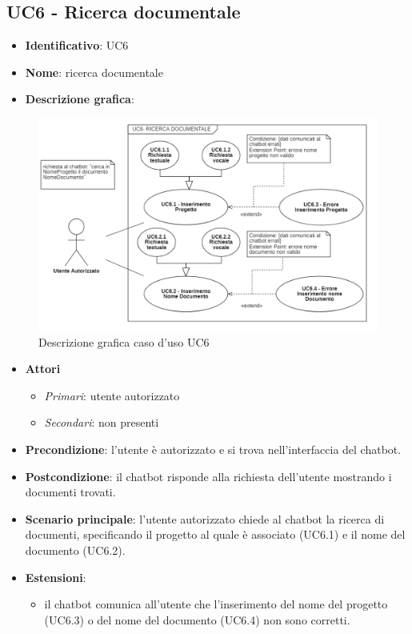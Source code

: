 \subsection{UC6 - Ricerca documentale}
\begin{itemize}
    \item \textbf{Identificativo}: UC6
    \item \textbf{Nome}: ricerca documentale
    \item \textbf{Descrizione grafica}:
\end{itemize}

\begin{figure}[h]
   \centering
   \includegraphics[scale=2]{images/UC6.png} 
   \caption{Descrizione grafica caso d'uso UC6}
\end{figure}

 \begin{itemize}
    \item \textbf{Attori}
 \begin{itemize} 
    \item \textit{Primari}: utente autorizzato
    \item \textit{Secondari}: non presenti
 \end{itemize}
 \item \textbf{Precondizione}: l'utente è autorizzato e si trova nell'interfaccia del chatbot.
 \item \textbf{Postcondizione}: il chatbot risponde alla richiesta dell'utente mostrando i documenti trovati.
 \item \textbf{Scenario principale}: l'utente autorizzato chiede al chatbot la ricerca di documenti, specificando il progetto al quale è associato (UC6.1) e il nome del documento (UC6.2).
 \item \textbf{Estensioni}: 
 \begin{itemize} 
    \item il chatbot comunica all'utente che l'inserimento del nome del progetto (UC6.3) o del nome del documento (UC6.4) non sono corretti.
 \end{itemize}
\end{itemize}
\newpage
